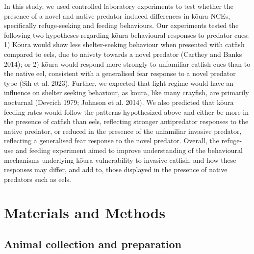 \documentclass[
  12pt,
  a4paper,
  oneside]{scrbook}
\begin{document}
In this study, we used controlled laboratory experiments to test whether
the presence of a novel and native predator induced differences in kōura
NCEs, specifically refuge-seeking and feeding behaviours. Our
experiments tested the following two hypotheses regarding kōura
behavioural responses to predator cues: 1) Kōura would show less
shelter-seeking behaviour when presented with catfish compared to eels,
due to naivety towards a novel predator (Carthey and Banks 2014); or 2)
kōura would respond more strongly to unfamiliar catfish cues than to the
native eel, consistent with a generalised fear response to a novel
predator type (Sih et al. 2023). Further, we expected that light regime
would have an influence on shelter seeking behaviour, as kōura, like
many crayfish, are primarily nocturnal (Devcich 1979; Johnson et al.
2014). We also predicted that kōura feeding rates would follow the
patterns hypothesized above and either be more in the presence of
catfish than eels, reflecting stronger antipredator responses to the
native predator, or reduced in the presence of the unfamiliar invasive
predator, reflecting a generalised fear response to the novel predator.
Overall, the refuge-use and feeding experiment aimed to improve
understanding of the behavioural mechanisms underlying kōura
vulnerability to invasive catfish, and how these responses may differ,
and add to, those displayed in the presence of native predators such as
eels.

\section{Materials and Methods}\label{materials-and-methods}

\subsection{Animal collection and
preparation}\label{animal-collection-and-preparation}
\end{document}
